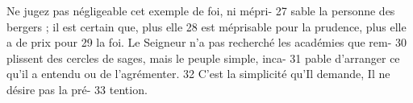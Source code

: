 Ne jugez pas négligeable cet exemple de foi, ni mépri-	 
27	 	sable la personne des bergers ; il est certain que, plus elle	 
28	 	est méprisable pour la prudence, plus elle a de prix pour	 
29	 	la foi. Le Seigneur n'a pas recherché les académies que rem-	 
30	 	plissent des cercles de sages, mais le peuple simple, inca-	 
31	 	pable d'arranger ce qu'il a entendu ou de l'agrémenter.	 
32	 	C'est la simplicité qu'Il demande, Il ne désire pas la pré-	 
33	 	tention.